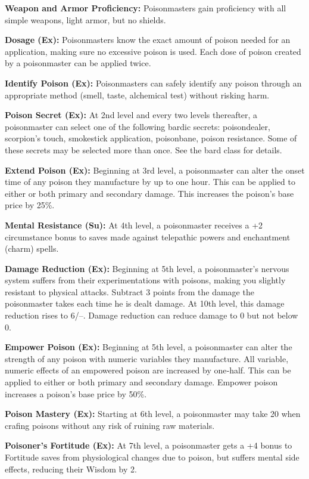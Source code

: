 {
\textbf{Weapon and Armor Proficiency:} Poisonmasters gain proficiency with all simple weapons, light armor, but no shields.

\textbf{Dosage (Ex):} Poisonmasters know the exact amount of poison needed for an application, making sure no excessive poison is used. Each dose of poison created by a poisonmaster can be applied twice.

\textbf{Identify Poison (Ex):} Poisonmasters can safely identify any poison through an appropriate method (smell, taste, alchemical test) without risking harm.

\textbf{Poison Secret (Ex):} At 2nd level and every two levels thereafter, a poisonmaster can select one of the following bardic secrets: poisondealer, scorpion's touch, smokestick application, poisonbane, poison resistance. Some of these secrets may be selected more than once. See the bard class for details.

\textbf{Extend Poison (Ex):} Beginning at 3rd level, a poisonmaster can alter the onset time of any poison they manufacture by up to one hour. This can be applied to either or both primary and secondary damage. This increases the poison's base price by 25\%.

\textbf{Mental Resistance (Su):} At 4th level, a poisonmaster receives a +2 circumstance bonus to saves made against telepathic powers and enchantment (charm) spells.

\textbf{Damage Reduction (Ex):} Beginning at 5th level, a poisonmaster's nervous system suffers from their experimentations with poisons, making you slightly resistant to physical attacks. Subtract 3 points from the damage the poisonmaster takes each time he is dealt damage. At 10th level, this damage reduction rises to 6/--. Damage reduction can reduce damage to 0 but not below 0.

\textbf{Empower Poison (Ex):} Beginning at 5th level, a poisonmaster can alter the strength of any poison with numeric variables they manufacture. All variable, numeric effects of an empowered poison are increased by one‐half. This can be applied to either or both primary and secondary damage. Empower poison increases a poison's base price by 50\%.

\textbf{Poison Mastery (Ex):} Starting at 6th level, a poisonmaster may take 20 when crafing poisons without any risk of ruining raw materials.

\textbf{Poisoner's Fortitude (Ex):} At 7th level, a poisonmaster gets a +4 bonus to Fortitude saves from physiological changes due to poison, but suffers mental side effects, reducing their Wisdom by 2.

}
